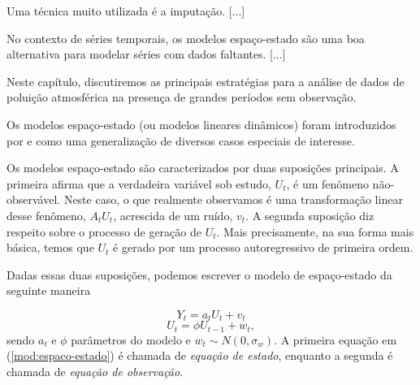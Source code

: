 Uma técnica muito utilizada é a imputação. [...]

No contexto de séries temporais, os modelos espaço-estado são uma boa alternativa para modelar séries com dados faltantes. [...]

Neste capítulo, discutiremos as principais estratégias para a análise de dados de poluição atmosférica na presença de grandes períodos sem observação.


Os modelos espaço-estado (ou modelos lineares dinâmicos) foram introduzidos por \cite{Kalman1960} e \cite{Kalman1961} como uma generalização de diversos casos especiais de interesse. 

Os modelos espaço-estado são caracterizados por duas suposições principais. A primeira afirma que a verdadeira variável sob estudo, $U_t$, é um fenômeno não-observável. Neste caso, o que realmente observamos é uma transformação linear desse fenômeno, $A_tU_t$, acrescida de um ruído, $v_t$. A segunda suposição diz respeito sobre o processo de geração de $U_t$. Mais precisamente, na sua forma mais básica, temos que $U_t$ é gerado por um processo autoregressivo de primeira ordem.

Dadas essas duas suposições, podemos escrever o modelo de espaço-estado da seguinte maneira

\begin{displaymath}
Y_t = a_tU_t + v_t
\end{displaymath}
\begin{equation}
U_t = \phi U_{t-1} + w_t,
\label{mod:espaco-estado}
\end{equation}
sendo $a_t$ e $\phi$ parâmetros do modelo e $w_t \sim N(0, \sigma_w)$. A primeira equação em (\ref{mod:espaco-estado}) é chamada de \textit{equação de estado}, enquanto a segunda é chamada de \textit{equação de observação}.



